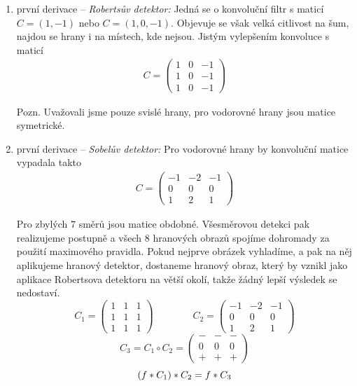 \begin{enumerate}
\item první derivace -- \emph{Robertsův detektor:} Jedná se o konvoluční filtr s maticí $C=(1, -1)$ nebo $C=(1, 0, -1)$.
Objevuje se však velká citlivost na šum, najdou se hrany i na místech, kde nejsou. Jistým vylepšením konvoluce s maticí
\begin{align}
C=\left(\begin{array}{ccc}1&0&-1\\1&0&-1\\1&0&-1\end{array}\right)
\end{align}

Pozn. Uvažovali jsme pouze svislé hrany, pro vodorovné hrany jsou matice symetrické.

\item první derivace -- \emph{Sobelův detektor:} Pro vodorovné hrany by konvoluční matice vypadala takto
\begin{align}
C=\left(\begin{array}{ccc}-1&-2&-1\\0&0&0\\1&2&1\end{array}\right)
\end{align}

Pro zbylých 7 směrů jsou matice obdobné. Všesměrovou detekci pak realizujeme postupně a všech 8 hranových obrazů spojíme 
dohromady za použití maximového pravidla. Pokud nejprve obrázek vyhladíme, a pak na něj aplikujeme hranový detektor,
dostaneme hranový obraz, který by vznikl jako aplikace Robertsova detektoru na větší okolí, takže žádný lepší výsledek
se nedostaví.
\begin{equation}
C_1 = \left(\begin{array}{ccc}1&1&1\\1&1&1\\1&1&1\end{array}\right) \qquad \qquad
C_2 = \left(\begin{array}{ccc}-1&-2&-1\\0&0&0\\1&2&1\end{array}\right)
\end{equation}
\begin{equation}
C_3 = C_1\circ C_2=\left(\begin{array}{ccc}-&-&-\\0&0&0\\+&+&+\end{array}\right)
\end{equation}
\begin{equation}
(f\ast C_1)\ast C_2 = f\ast C_3
\end{equation}



\end{enumerate}
